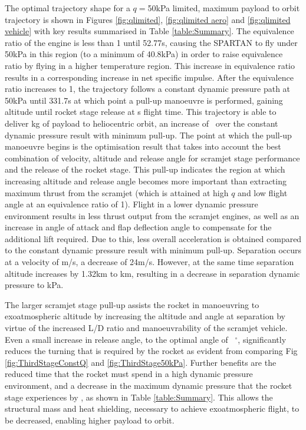 The optimal trajectory shape for a $q=$50kPa limited, maximum payload to orbit trajectory is shown in Figures \ref{fig:qlimited}, \ref{fig:qlimited aero} and \ref{fig:qlimited vehicle} with key results summarised in Table \ref{table:Summary}. 
The equivalence ratio of the engine is less than 1 until 52.77s, causing the SPARTAN to fly under 50kPa in this region (to a minimum of 40.8kPa) in order to raise equivalence ratio by flying in a higher temperature region. This increase in equivalence ratio results in a corresponding increase in net specific impulse.
After the equivalence ratio increases to 1, the trajectory follows a constant dynamic pressure path at 50kPa until 331.7s at which point a pull-up manoeuvre is performed, gaining altitude until rocket stage release at \FlightTimeFiftykPa s flight time. 
This trajectory is able to deliver \PayloadToOrbitFiftykPa kg of payload to heliocentric orbit, an increase of \PayloadImprovement\ over the constant dynamic pressure result with minimum pull-up. The point at which the pull-up manoeuvre begins is the optimisation result that takes into account the best combination of velocity, altitude and release angle for scramjet stage performance and the release of the rocket stage. This pull-up indicates the region at which increasing altitude and release angle becomes more important than extracting maximum thrust from the scramjet (which is attained at high $q$ and low flight angle at an equivalence ratio of 1).
Flight in a lower dynamic pressure environment results in less thrust output from the scramjet engines, as well as an increase in angle of attack and flap deflection angle to compensate for the additional lift required. Due to this, less overall acceleration is obtained compared to the constant dynamic pressure result with minimum pull-up. Separation occurs at a velocity of \SeparationvFiftykPa m/s, a decrease of 24m/s. However, at the same time separation altitude increases by 1.32km to \SeparationAltFiftykPa km, resulting in a decrease in separation dynamic pressure to \SeparationqFiftykPa kPa. 

The larger scramjet stage pull-up assists the rocket in manoeuvring to exoatmospheric altitude by increasing the altitude and angle at separation by virtue of the increased L/D ratio and manoeuvrability of the scramjet vehicle. Even a small increase in release angle, to the optimal angle of \SeparationAngleFiftykPa~$^\circ$, significantly reduces the turning that is required by the rocket as evident from comparing Fig \ref{fig:ThirdStageConstQ} and \ref{fig:ThirdStage50kPa}. Further benefits are the reduced time that the rocket must spend in a high dynamic pressure environment, and a decrease in the maximum dynamic pressure that the rocket stage experiences by \qDecrease, as shown in Table \ref{table:Summary}. This allows the structural mass and heat shielding, necessary to achieve exoatmospheric flight, to be decreased, enabling higher payload to orbit. 


